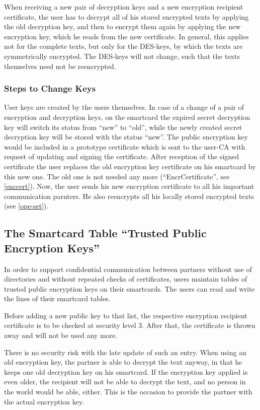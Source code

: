 When receiving a new pair of decryption keys and a new
encryption recipient certificate,
the user has to decrypt all of his stored encrypted texts
by applying the old decryption key,
and then to encrypt them again
by applying the new encryption key, which he reads from the new certificate.
In general, this applies not for the complete texts, but only for
the DES-keys, by which the texts are symmetrically encrypted.
The DES-keys will not change, such that the texts themselves
need not be reencrypted.

\subsubsection{Steps to Change Keys}
\label{ope-sck}

User keys are created by the users themselves.
In case of a change of a pair of encryption and decryption keys,
on the smartcard
the expired secret decryption key will switch its status from
``new'' to ``old'', while the newly created secret decryption
key will be stored with the status ``new''.
The public encryption key would be included in a prototype
certificate which is sent to the user-CA with request of
updating and signing the certificate.
After reception of the signed certificate the user
replaces the old encryption key certificate on his smartcard
by this new one. The old one is not needed any more
(``EncrCertificate'', see \ref{enccert}).
Now, the user sends his new encryption certificate
to all his important communication parnters.
He also reencrypts all his locally stored encrypted texts (see \ref{ope-set}).

\subsection{The Smartcard Table
``Trusted Public Encryption Keys''}
\label{ope-tpvk}

In order to support confidential communication between partners without
use of directories and without repeated checks of certificates,
users maintain tables of trusted public encryption keys
on their smartcards.
The users can read and write the lines of their smartcard tables.

Before adding a new public key to that list, the respective
encryption recipient certificate is to be checked at security level 3.
After that, the certificate is thrown away and will not be used any more.

There is no security risk with the late update of such an entry.
When using an old encryption key, the partner is able to decrypt the
text anyway, in that he keeps one old decryption key on his smartcard.
If the encryption key applied is even older, the recipient will not
be able to decrypt the text, and no person in the world would be able,
either. This is the occasion to provide the partner with the actual
encryption key.
